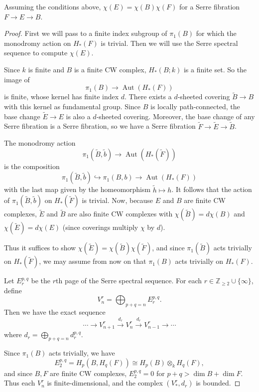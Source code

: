 \documentclass[12pt]{article}
\begin{document}
\begin{proposition}
Assuming the conditions above, $\chi(E) = \chi(B)\chi(F)$ for a Serre fibration $F \to E \to B$.
\end{proposition}

\begin{proof}
First we will pass to a finite index subgroup of $\pi_1(B)$ for which the monodromy action on $H_\ast(F)$ is trivial. Then we will use the Serre spectral sequence to compute $\chi(E)$. 

Since $k$ is finite and $B$ is a finite CW complex, $H_\ast(B;k)$ is a finite set.
So the image of \[\pi_1(B) \to \operatorname{Aut}(H_\ast(F))\] is finite, whose kernel has finite index $d$. There exists a $d$-sheeted covering $\tilde{B} \to B$ with this kernel as fundamental group.
Since $B$ is locally path-connected, the base change $\tilde{E} \to E$ is also a $d$-sheeted covering.
Moreover, the base change of any Serre fibration is a Serre fibration, so we have a Serre fibration $\tilde{F} \to \tilde{E} \to \tilde{B}$.

The monodromy action
\[
\pi_1(\tilde{B}, \tilde{b}) \to \operatorname{Aut}(H_\ast(\tilde{F}))
\]
is the composition 
\[
\pi_1(\tilde{B}, \tilde{b}) \hookrightarrow \pi_1(B, b) \to \operatorname{Aut}(H_\ast(F))
\]
with the last map given by the homeomorphism $\tilde{h} \mapsto h$.
It follows that the action of $\pi_1(\tilde{B}, \tilde{b})$ on $H_\ast(\tilde{F})$ is trivial.
Now, because $E$ and $B$ are finite CW complexes, $\tilde{E}$ and $\tilde{B}$ are also finite CW complexes with 
$\chi(\tilde{B}) = d\chi(B)$ and $\chi(\tilde{E}) = d\chi(E)$ (since coverings multiply $\chi$ by $d$).

Thus it suffices to show $\chi(\tilde{E}) = \chi(\tilde{B})\chi(\tilde{F})$, 
and since $\pi_1(\tilde{B})$ acts trivially on $H_\ast(\tilde{F})$, we may assume from now on that $\pi_1(B)$ acts trivially on $H_\ast(F)$.

\medskip
\noindent
Let $E_r^{p,q}$ be the $r$th page of the Serre spectral sequence.
For each $r \in \mathbb{Z}_{\ge 2} \cup \{\infty\}$, define
\[
V_n^r = \bigoplus_{p+q=n} E_r^{p,q}.
\]
Then we have the exact sequence
\[
\cdots \to V_{n+1}^r \xrightarrow{d_r} V_n^r \xrightarrow{d_r} V_{n-1}^r \to \cdots
\]
where $d_r = \bigoplus_{p+q=n} d_r^{p,q}$.

\noindent
Since $\pi_1(B)$ acts trivially, we have
\[
E_2^{p,q} = H_p(B, H_q(F)) \cong H_p(B) \otimes_k H_q(F),
\]
and since $B,F$ are finite CW complexes, $E_2^{p,q}=0$ for $p+q>\dim B + \dim F$.
Thus each $V_n^r$ is finite-dimensional, and the complex $(V_\ast^r,d_r)$ is bounded.


\end{proof}
\end{document}
